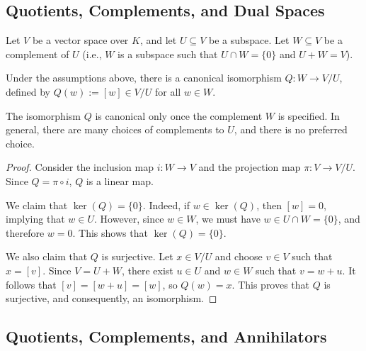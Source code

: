 \subsection{Quotients, Complements, and Dual Spaces}

Let $V$ be a vector space over $K$, and let $U \subseteq V$ be a subspace. Let $W \subseteq V$ be a complement of $U$ (i.e., $W$ is a subspace such that $U \cap W = \{0\}$ and $U + W = V$).

\begin{proposition} \label{prop:iso_complement}
  Under the assumptions above, there is a canonical isomorphism $Q \colon W \to V/U$, defined by $Q(w) := [w] \in V/U$ for all $w \in W$.
\end{proposition}

\begin{remark}
  The isomorphism $Q$ is canonical only once the complement $W$ is specified. In general, there are many choices of complements to $U$, and there is no preferred choice.
\end{remark}

\begin{proof}
  Consider the inclusion map $i \colon W \to V$ and the projection map $\pi \colon V \to V/U$. Since $Q = \pi \circ i$, $Q$ is a linear map.

  We claim that $\ker(Q) = \{0\}$. Indeed, if $w \in \ker(Q)$, then $[w] = 0$, implying that $w \in U$. However, since $w \in W$, we must have $w \in U \cap W = \{0\}$, and therefore $w = 0$. This shows that $\ker(Q) = \{0\}$.

  We also claim that $Q$ is surjective. Let $x \in V/U$ and choose $v \in V$ such that $x = [v]$. Since $V = U + W$, there exist $u \in U$ and $w \in W$ such that $v = w + u$. It follows that $[v] = [w + u] = [w]$, so $Q(w) = x$. This proves that $Q$ is surjective, and consequently, an isomorphism.
\end{proof}

\subsection{Quotients, Complements, and Annihilators}


